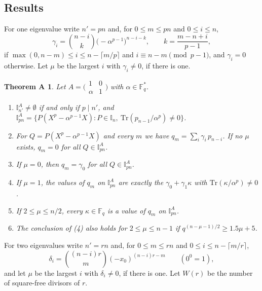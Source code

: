 \documentclass[11pt,a4paper]{amsart}
\newtheorem*{theoremA}{Theorem A}
\theoremstyle{remark}
\newcommand{\Fq}{\mathbb{F}_q}
\newcommand{\Tr}{\mathrm{Tr}}
\newcommand{\I}{\mathbb{I}}
\newcommand{\mat}[4]{\bigl(\begin{smallmatrix}#1&#2\\#3&#4\end{smallmatrix}\bigr)}
\begin{document}
\subsection{Results}
For one eigenvalue write $n'=pn$ and, for $0\le m\le pn$ and $0\le i\le n$,
\begin{equation}\label{eq:gamma}
\gamma_i=\binom{n-i}{k}\bigl(-\alpha^{p-1}\bigr)^{n-i-k},\qquad k=\frac{m-n+i}{p-1},
\end{equation}
if $\max(0,n-m)\le i\le n-\lceil m/p\rceil$ and $i\equiv n-m\pmod{p-1}$, and $\gamma_i=0$ otherwise. Let $\mu$ be
the largest $i$ with $\gamma_i\ne0$, if there is one.

\begin{theoremA}
Let $A=\mat10\alpha1$ with $\alpha\in\Fq^*$.
\begin{enumerate}
\item[(0)] $\I^A_{n'}\ne\emptyset$ if and only if $p\mid n'$, and
$\I^A_{pn}=\{P(X^p-\alpha^{p-1}X):P\in\I_n,\ \Tr(p_{n-1}/\alpha^p)\ne0\}$.
\item[(1)] For $Q=P(X^p-\alpha^{p-1}X)$ and every $m$ we have $q_m=\sum_{i}\gamma_i\,p_{n-i}$. If no $\mu$ exists,
$q_m=0$ for all $Q\in\I^A_{pn}$.
\item[(2)] If $\mu=0$, then $q_m=\gamma_0$ for all $Q\in\I^A_{pn}$.
\item[(3)] If $\mu=1$, the values of $q_m$ on $\I^A_{pn}$ are exactly the $\gamma_0+\gamma_1\kappa$ with
$\Tr(\kappa/\alpha^p)\ne0$.
\item[(4)] If $2\le\mu\le n/2$, every $\kappa\in\Fq$ is a value of $q_m$ on $\I^A_{pn}$.
\item[(5)] The conclusion of (4) also holds for $2\le\mu\le n-1$ if $q^{(n-\mu-1)/2}\ge1.5\mu+5$.
\end{enumerate}
\end{theoremA}

For two eigenvalues write $n'=rn$ and, for $0\le m\le rn$ and $0\le i\le n-\lceil m/r\rceil$,
\begin{equation}\label{eq:delta}
\delta_i=\binom{(n-i)r}{m}(-x_0)^{(n-i)r-m}\qquad(0^0=1),
\end{equation}
and let $\mu$ be the largest $i$ with $\delta_i\ne0$, if there is one. Let $W(r)$ be the number of square-free
divisors of $r$.
\end{document}

